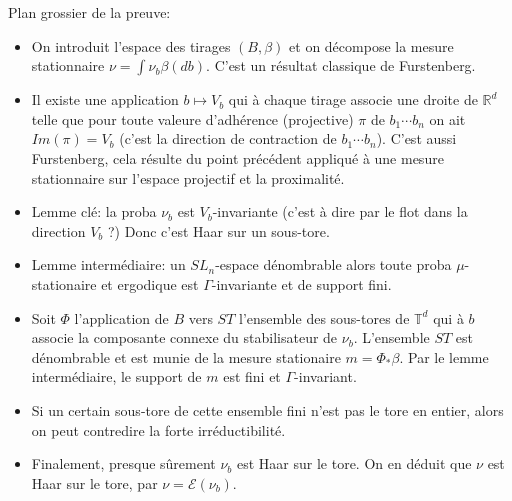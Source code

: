 \documentclass[12pt, a4paper,oneside]{amsart} %
\theoremstyle{definition}
\theoremstyle{remark}
\theoremstyle{remark}
\newcommand\R{\mathbb{R}}
\newcommand\T{\mathbb{T}}
\begin{document}
Plan grossier de la preuve:
\begin{itemize}
	\item On introduit l'espace des tirages $ (B,\beta) $
		et on décompose la mesure stationnaire
		$ \nu = \int \nu_{b} \beta(db) $.
		C'est un résultat classique de Furstenberg.
	\item Il existe une application $ b \mapsto V_{b} $
		qui à chaque tirage associe une droite
		de $ \R^{d} $
		telle que pour toute valeure d'adhérence (projective)
		$ \pi $ 
		de $ b_{1} \cdots b_{n} $
		on ait $ Im(\pi) = V_{b} $
		(c'est la direction de contraction de $ b_{1} \cdots b_{n} $).
		C'est aussi Furstenberg, cela résulte du point précédent
		appliqué à une mesure stationnaire sur l'espace projectif
		et la proximalité.
	\item Lemme clé: la proba $ \nu_{b} $ est $ V_{b} $-invariante
		(c'est à dire par le flot dans la direction $ V_{b} $ ?)
		Donc c'est Haar sur un sous-tore. 
	\item Lemme intermédiaire: un $ SL_{n} $-espace dénombrable
		alors toute proba $ \mu $-stationaire et ergodique
		est $ \Gamma $-invariante et de support fini.
	\item Soit $ \Phi $ l'application de $ B $
		vers $ ST $ l'ensemble des sous-tores de $ \T^{d} $
		qui à $ b $ associe
		la composante connexe du stabilisateur
		de $ \nu_{b} $.
		L'ensemble $ ST $ est dénombrable
		et est munie de la mesure stationaire
		$  m = \Phi_{*} \beta $.
		Par le lemme intermédiaire,
		le support de $ m $ est fini
		et $ \Gamma $-invariant.
	\item Si un certain sous-tore de cette ensemble
		fini n'est pas le tore en entier,
		alors on peut contredire la forte irréductibilité.
	\item Finalement, presque sûrement $ \nu_{b} $ est Haar
		sur le tore. On en déduit que $ \nu $ est Haar
		sur le tore, par $ \nu = \mathcal{E}(\nu_{b}) $.
\end{itemize}



\end{document}

